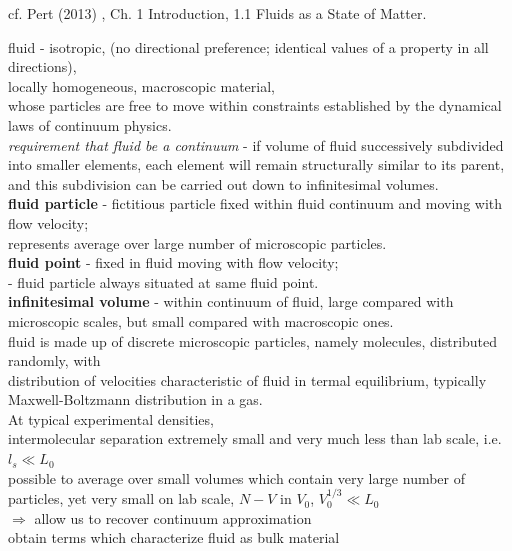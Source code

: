 \documentclass[10pt]{amsart}
\begin{document}
\begin{multicols*}{2}
cf. Pert (2013) \cite{Pert2013}, Ch. 1 Introduction, 1.1 Fluids as a State of Matter.

fluid - isotropic, (no directional preference; identical values of a property in all directions), \\
locally homogeneous, macroscopic material, \\
whose particles are free to move within constraints established by the dynamical laws of continuum physics. \\
\emph{requirement that fluid be a continuum} - if volume of fluid successively subdivided into smaller elements, each element will remain structurally similar to its parent, and this subdivision can be carried out down to infinitesimal volumes. \\

\textbf{fluid particle} - fictitious particle fixed within fluid continuum and moving with flow velocity; \\
represents average over large number of microscopic particles. \\

\textbf{fluid point} - fixed in fluid moving with flow velocity; \\
- fluid particle always situated at same fluid point. \\

\textbf{infinitesimal volume} - within continuum of fluid, large compared with microscopic scales, but small compared with macroscopic ones. \\

fluid is made up of discrete microscopic particles, namely molecules, distributed randomly, with \\
distribution of velocities characteristic of fluid in termal equilibrium, typically Maxwell-Boltzmann distribution in a gas. \\

At typical experimental densities, \\
intermolecular separation extremely small and very much less than lab scale, i.e. $l_s \ll L_0$ \\
possible to average over small volumes which contain very large number of particles, yet very small on lab scale, $N-V$ in $V_0$, $V_0^{1/3} \ll L_0$ \\
$\Longrightarrow$ allow us to recover continuum approximation \\
obtain terms which characterize fluid as bulk material \\


\end{multicols*}
\end{document}
